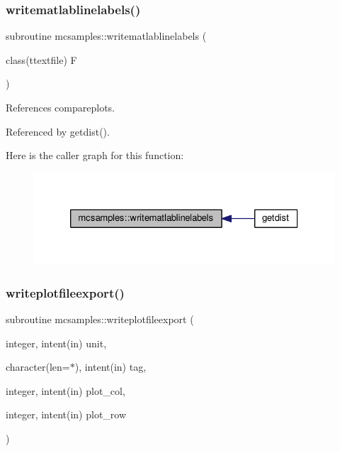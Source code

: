 \subsubsection{\texorpdfstring{writematlablinelabels()}{writematlablinelabels()}}
{\footnotesize\ttfamily subroutine mcsamples\+::writematlablinelabels (\begin{DoxyParamCaption}\item[{class(ttextfile)}]{F }\end{DoxyParamCaption})}



References compareplots.



Referenced by getdist().

Here is the caller graph for this function\+:
\nopagebreak
\begin{figure}[H]
\begin{center}
\leavevmode
\includegraphics[width=326pt]{namespacemcsamples_a7fb178ee92298048973cca975336489e_icgraph}
\end{center}
\end{figure}
\mbox{\label{namespacemcsamples_aeb1af08402647e8ef9e1d8f97e774e3a}} 
\subsubsection{\texorpdfstring{writeplotfileexport()}{writeplotfileexport()}}
{\footnotesize\ttfamily subroutine mcsamples\+::writeplotfileexport (\begin{DoxyParamCaption}\item[{integer, intent(in)}]{unit,  }\item[{character(len=$\ast$), intent(in)}]{tag,  }\item[{integer, intent(in)}]{plot\+\_\+col,  }\item[{integer, intent(in)}]{plot\+\_\+row }\end{DoxyParamCaption})}



